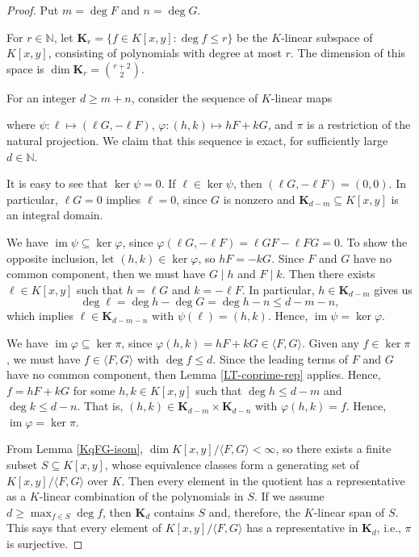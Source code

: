 \documentclass[12pt]{article}
\theoremstyle{definition}
\newcommand{\N}{\mathbb{N}}
\renewcommand{\phi}{\varphi}
\newcommand{\<}{\langle}
\renewcommand{\>}{\rangle}
\newcommand{\KK}{\mathbf{K}}
\DeclareMathOperator{\im}{im}
\begin{document}
\begin{proof}
    Put $m = \deg F$ and $n = \deg G$.

    For $r \in \N$, let $\KK_r = \{f \in K[x, y] : \deg f \leq r\}$ be the $K$-linear subspace of $K[x, y]$, consisting of polynomials with degree at most $r$. The dimension of this space is $\dim \KK_r = \binom{r + 2}{2}$.

    For an integer $d \geq m + n$, consider the sequence of $K$-linear maps
    \begin{center}
    \end{center}
    where $\psi : \ell \mapsto (\ell G, -\ell F)$,  $\phi : (h, k) \mapsto hF + kG$, and $\pi$ is a restriction of the natural projection. We claim that this sequence is exact, for sufficiently large $d \in \N$.

    It is easy to see that $\ker \psi = 0$. If $\ell \in \ker \psi$, then $(\ell G, -\ell F) = (0, 0)$. In particular, $\ell G = 0$ implies $\ell = 0$, since $G$ is nonzero and $\KK_{d-m} \subseteq K[x, y]$ is an integral domain.
    
    We have $\im \psi \subseteq \ker \phi$, since $\phi(\ell G, -\ell F) = \ell GF - \ell F G = 0$. To show the opposite inclusion, let $(h, k) \in \ker \phi$, so $hF = -kG$. Since $F$ and $G$ have no common component, then we must have $G \mid h$ and $F \mid k$. Then there exists $\ell \in K[x, y]$ such that $h = \ell G$ and $k = -\ell F$. In particular, $h \in \KK_{d-m}$ gives us
    \[
        \deg \ell = \deg h - \deg G = \deg h - n \leq d - m - n,
    \]
    which implies $\ell \in \KK_{d-m-n}$ with $\psi(\ell) = (h, k)$. Hence, $\im \psi = \ker \phi$.

    We have $\im \phi \subseteq \ker \pi$, since $\phi(h, k) = hF + kG \in \<F, G\>$. Given any $f \in \ker \pi$, we must have $f \in \<F, G\>$ with $\deg f \leq d$. Since the leading terms of $F$ and $G$ have no common component, then Lemma \ref{LT-coprime-rep} applies. Hence, $f = hF + kG$ for some $h, k \in K[x, y]$ such that $\deg h \leq d - m$ and $\deg k \leq d - n$. That is, $(h, k) \in \KK_{d-m} \times \KK_{d-n}$ with $\phi(h, k) = f$. Hence, $\im \phi = \ker \pi$.

    From Lemma \ref{KqFG-isom}, $\dim K[x, y] / \<F, G\> < \infty$, so there exists a finite subset $S \subseteq K[x, y]$, whose equivalence classes form a generating set of $K[x, y] / \<F, G\>$ over $K$. Then every element in the quotient has a representative as a $K$-linear combination of the polynomials in $S$. If we assume $d \geq \max_{f \in S} \deg f$, then $\KK_d$ contains $S$ and, therefore, the $K$-linear span of $S$. This says that every element of $K[x, y] / \<F, G\>$ has a representative in $\KK_d$, i.e., $\pi$ is surjective.


\end{proof}
\end{document}
